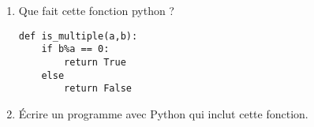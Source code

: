 
\begin{enumerate}
\item Que fait cette fonction python ?

\begin{lstlisting}
def is_multiple(a,b):
	if b%a == 0:
		return True
	else 
		return False
\end{lstlisting}

\item Écrire un programme avec Python qui inclut cette fonction.

\end{enumerate}